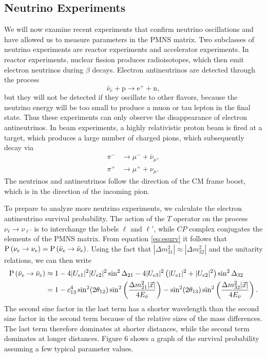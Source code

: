 \subsection{Neutrino Experiments}
We will now examine recent experiments that confirm neutrino oscillations and
have allowed us to measure parameters in the PMNS matrix.
Two subclasses of neutrino experiments are reactor experiments
and accelerator experiments. In reactor experiments, nuclear fission produces
radioisotopes, which then emit electron neutrinos during $\beta$ decays.
Electron antineutrinos are detected through the process
\begin{equation}
  \label{eq:betadecay}
  \bar{\nu}_e+\text{p}\to\text{e}^++\text{n},
\end{equation}
but they will not be detected if they oscillate to other flavors, because
the neutrino energy will be too small to produce a muon or tau lepton in
the final state. Thus these experiments can only observe the disappearance
of electron antineutrinos. In beam experiments, a highly relativistic
proton beam is fired at a target, which produces a large number of charged
pions, which subsequently decay via
\begin{equation}
  \begin{aligned}
    \pi^-&\to\mu^-+\bar{\nu}_\mu, \\
    \pi^+&\to\mu^++\nu_\mu.
  \end{aligned}
\end{equation}
The neutrinos and antineutrinos follow the direction of the CM frame boost,
which is in the direction of the incoming pion.

To prepare to analyze more neutrino experiments, we calculate the
electron antineutrino survival probability.
The action of the $T$ operator on the process $\nu_\ell\to\nu_{\ell'}$ is
to interchange the labels $\ell$ and $\ell'$, while $CP$ complex conjugates
the elements of the PMNS matrix. From equation \eqref{eq:esurv} it follows
that $\operatorname{P}\left(\nu_e\to\nu_e\right)=\operatorname{P}\left(\bar{\nu}_e\to\bar{\nu}_e\right)$. Using the fact
that $|\Delta m_{31}^2|\approx|\Delta m_{32}^2|$ and the unitarity relations,
we can then write
\begin{equation}
  \label{eq:prb}
  \begin{aligned}
    \operatorname{P}\left(\bar{\nu}_e\to\bar{\nu}_e\right)
      &\approx 1-4|U_{e1}|^2|U_{e2}|^2\sin^2\Delta_{21}
              -4|U_{e3}|^2\left(|U_{e1}|^2+|U_{e2}|^2\right)\sin^2\Delta_{32}
       \\ 
      &= 1-c_{13}^4\sin^2(2\theta_{12})
           \sin^2\left(\frac{\Delta m_{21}^2 |\vec{x}|}{4E_{\bar{\nu}}}
           \right) -\sin^2(2\theta_{13})
           \sin^2\left(\frac{\Delta m_{32}^2 |\vec{x}|}{4E_{\bar{\nu}}}
           \right).
  \end{aligned}
\end{equation}
The second sine factor in the last term has a shorter wavelength than the
second sine factor in the second term because of the relative sizes of the
mass differences. The last term therefore dominates at shorter distances,
while the second term dominates at longer distances. Figure 6 shows a graph
of the survival probability assuming a few typical parameter values.

